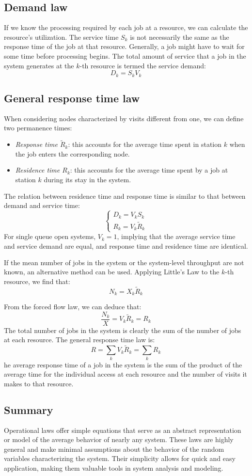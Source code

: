 \subsection{Demand law}
If we know the processing required by each job at a resource, we can calculate the resource's utilization. 
The service time $S_k$ is not necessarily the same as the response time of the job at that resource. 
Generally, a job might have to wait for some time before processing begins. 
The total amount of service that a job in the system generates at the $k$-th resource is termed the service demand:
\[D_k=S_kV_k\]

\subsection{General response time law}
When considering nodes characterized by visits different from one, we can define two permanence times:
\begin{itemize}
    \item \textit{Response time $\tilde{R}_k$}: this accounts for the average time spent in station $k$ when the job enters the corresponding node.
    \item \textit{Residence time $R_k$}: this accounts for the average time spent by a job at station $k$ during its stay in the system.
\end{itemize}
The relation between residence time and response time is similar to that between demand and service time:
\[\begin{cases}
    D_k=V_kS_k \\
    R_k=V_k\tilde{R}_k
\end{cases}\]
For single queue open systems, $V_k=1$, implying that the average service time and service demand are equal, and response time and residence time are identical.

If the mean number of jobs in the system or the system-level throughput are not known, an alternative method can be used. 
Applying Little's Law to the $k$-th resource, we find that:
\[N_k=X_k\tilde{R}_k\]

From the forced flow law, we can deduce that:
\[\dfrac{N_k}{X}=V_k\tilde{R}_k=R_k\]
The total number of jobs in the system is clearly the sum of the number of jobs at each resource. 
The general response time law is:
\[R=\sum_kV_k\tilde{R}_k=\sum_kR_k\]
he average response time of a job in the system is the sum of the product of the average time for the individual access at each resource and the number of visits it makes to that resource.

\subsection{Summary}
Operational laws offer simple equations that serve as an abstract representation or model of the average behavior of nearly any system. 
These laws are highly general and make minimal assumptions about the behavior of the random variables characterizing the system. 
Their simplicity allows for quick and easy application, making them valuable tools in system analysis and modeling.